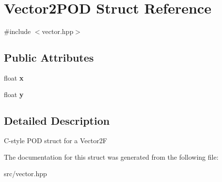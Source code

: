 \hypertarget{struct_vector2_p_o_d}{}\section{Vector2\+P\+OD Struct Reference}
\label{struct_vector2_p_o_d}


{\ttfamily \#include $<$vector.\+hpp$>$}

\subsection*{Public Attributes}
\begin{DoxyCompactItemize}
\item 
\mbox{\label{struct_vector2_p_o_d_aae469724c8da4468de3ac9415c75465e}} 
float {\bfseries x}
\item 
\mbox{\label{struct_vector2_p_o_d_a8ed0fe76a28039ddae57d8bda8bf2970}} 
float {\bfseries y}
\end{DoxyCompactItemize}


\subsection{Detailed Description}
C-\/style P\+OD struct for a Vector2F 

The documentation for this struct was generated from the following file\+:\begin{DoxyCompactItemize}
\item 
src/vector.\+hpp\end{DoxyCompactItemize}
